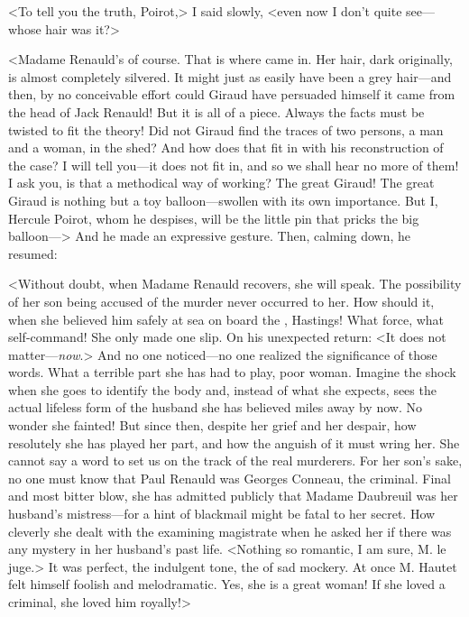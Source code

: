 <To tell you the truth, Poirot,> I said slowly, <even now I don't quite see—whose hair was it?> 

 <Madame Renauld's of course. That is where  came in. Her hair, dark originally, is almost completely silvered. It might just as easily have been a grey hair—and then, by no conceivable effort could Giraud have persuaded himself it came from the head of Jack Renauld! But it is all of a piece. Always the facts must be twisted to fit the theory! Did not Giraud find the traces of two persons, a man and a woman, in the shed? And how does that fit in with his reconstruction of the case? I will tell you—it does not fit in, and so we shall hear no more of them! I ask you, is that a methodical way of working? The great Giraud! The great Giraud is nothing but a toy balloon—swollen with its own importance. But I, Hercule Poirot, whom he despises, will be the little pin that pricks the big balloon—> And he made an expressive gesture. Then, calming down, he resumed: 

 <Without doubt, when Madame Renauld recovers, she will speak. The possibility of her son being accused of the murder never occurred to her. How should it, when she believed him safely at sea on board the  , Hastings! What force, what self-command! She only made one slip. On his unexpected return: <It does not matter—\emph{now}.> And no one noticed—no one realized the significance of those words. What a terrible part she has had to play, poor woman. Imagine the shock when she goes to identify the body and, instead of what she expects, sees the actual lifeless form of the husband she has believed miles away by now. No wonder she fainted! But since then, despite her grief and her despair, how resolutely she has played her part, and how the anguish of it must wring her. She cannot say a word to set us on the track of the real murderers. For her son's sake, no one must know that Paul Renauld was Georges Conneau, the criminal. Final and most bitter blow, she has admitted publicly that Madame Daubreuil was her husband's mistress—for a hint of blackmail might be fatal to her secret. How cleverly she dealt with the examining magistrate when he asked her if there was any mystery in her husband's past life. <Nothing so romantic, I am sure, M. le juge.> It was perfect, the indulgent tone, the  of sad mockery. At once M. Hautet felt himself foolish and melodramatic. Yes, she is a great woman! If she loved a criminal, she loved him royally!> 

